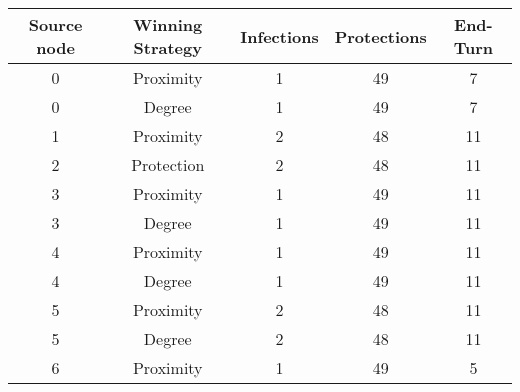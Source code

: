 \documentclass[results.tex]{subfiles}
\begin{document}
    \begin{center}
        \begin{tabular}{| c || c | c | c | c |}
            \hline
            {\bfseries Source node} & {\bfseries Winning Strategy} & {\bfseries Infections} & {\bfseries Protections}
            & {\bfseries End-Turn}
            \\  %
            \hline\hline
            0                       & Proximity                    & 1                      & 49                      & 7                    \\
            \hline
            0                       & Degree                       & 1                      & 49                      & 7                    \\
            \hline
            1                       & Proximity                    & 2                      & 48                      & 11                   \\
            \hline
            2                       & Protection                   & 2                      & 48                      & 11                   \\
            \hline
            3                       & Proximity                    & 1                      & 49                      & 11                   \\
            \hline
            3                       & Degree                       & 1                      & 49                      & 11                   \\
            \hline
            4                       & Proximity                    & 1                      & 49                      & 11                   \\
            \hline
            4                       & Degree                       & 1                      & 49                      & 11                   \\
            \hline
            5                       & Proximity                    & 2                      & 48                      & 11                   \\
            \hline
            5                       & Degree                       & 2                      & 48                      & 11                   \\
            \hline
            6                       & Proximity                    & 1                      & 49                      & 5                    \\

\end{tabular}
\end{center}
\end{document}
